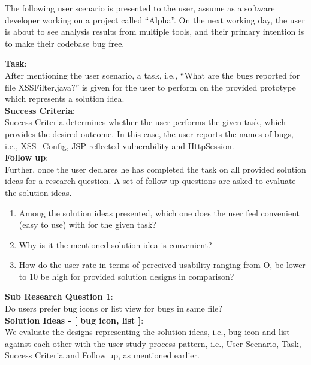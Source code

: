 The following user scenario is presented to the user, assume as a software developer working on a project called “Alpha”. On the next working day, the user is about to see analysis results from multiple tools, and their primary intention is to make their codebase bug free. 

\textbf{Task}: \\

After mentioning the user scenario, a task, i.e., “What are the bugs reported for file XSSFilter.java?” is given for the user to perform on the provided prototype which represents a solution idea. \\

\textbf{Success Criteria}: \\

Success Criteria determines whether the user performs the given task, which provides the desired outcome. In this case, the user reports the names of bugs, i.e., XSS\_Config, JSP reflected vulnerability and HttpSession. \\

\textbf{Follow up}: \\

Further, once the user declares he has completed the task on all provided solution ideas for a research question. A set of follow up questions are asked to evaluate the solution ideas. \\

\begin{enumerate}
\item Among the solution ideas presented, which one does the user feel convenient (easy to use) with for the given task?
\item Why is it the mentioned solution idea is convenient?
\item How do the user rate in terms of perceived usability ranging from O, be lower to 10 be high for provided solution designs in comparison?
\end{enumerate}

\textbf{Sub Research Question 1}: \\

Do users prefer bug icons or list view for bugs in same file? \\

\textbf{Solution Ideas - [ bug icon, list ]}: \\

We evaluate the designs representing the solution ideas, i.e., bug icon and list against each other with the user study process pattern, i.e., User Scenario, Task, Success Criteria and Follow up, as mentioned earlier. \\

